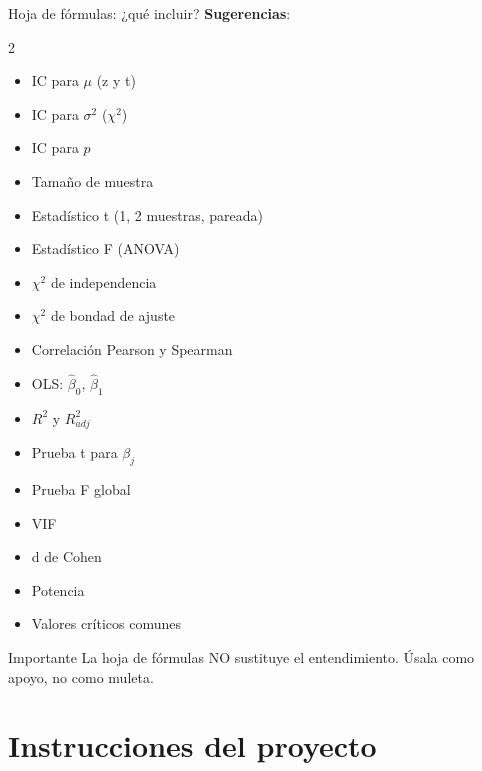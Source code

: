 \documentclass[aspectratio=169, 11pt]{beamer}
\begin{document}
\begin{frame}{Hoja de fórmulas: ¿qué incluir?}
\footnotesize
\textbf{Sugerencias}:
\begin{multicols}{2}
\begin{itemize}\setlength{\itemsep}{0pt}
\item IC para $\mu$ (z y t)
\item IC para $\sigma^2$ ($\chi^2$)
\item IC para $p$
\item Tamaño de muestra
\item Estadístico t (1, 2 muestras, pareada)
\item Estadístico F (ANOVA)
\item $\chi^2$ de independencia
\item $\chi^2$ de bondad de ajuste
\item Correlación Pearson y Spearman
\item OLS: $\hat{\beta}_0$, $\hat{\beta}_1$
\item $R^2$ y $R^2_{adj}$
\item Prueba t para $\beta_j$
\item Prueba F global
\item VIF
\item d de Cohen
\item Potencia
\item Valores críticos comunes
\end{itemize}
\end{multicols}

\begin{alertblock}{Importante}
La hoja de fórmulas NO sustituye el entendimiento. Úsala como apoyo, no como muleta.
\end{alertblock}
\end{frame}

\section{Instrucciones del proyecto}
\end{document}
